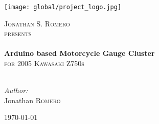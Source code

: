 
\begin{titlepage}
\begin{center}

\texttt{[image: global/project\_logo.jpg]}

\textsc{\LARGE Jonathan S. Romero}\\[1.5cm]

\textsc{\Large presents }\\[0.5cm]

\HRule \\[0.4cm]
{ \huge \bfseries Arduino based Motorcycle Gauge Cluster}\\[0.4cm]

\textsc{\Large  for 2005 Kawasaki Z750s}\\[0.5cm]

\HRule \\[1.5cm]

\begin{minipage}{0.4\textwidth}
\begin{flushleft} \large
\emph{Author:}\\
Jonathan \textsc{Romero}
\end{flushleft}
\end{minipage}

\vfill

{\large \today}

\end{center}
\end{titlepage}
